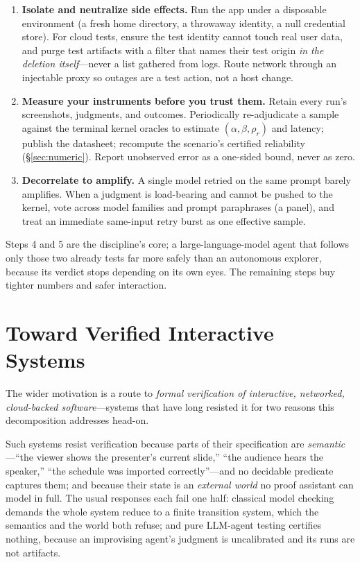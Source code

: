 \documentclass[acmsmall,screen,nonacm]{acmart}
\theoremstyle{acmdefinition}%
\theoremstyle{acmplain}%
\begin{document}
\begin{enumerate}
animation, streaming); the perception latency will read a state already
gone.
\item \textbf{Isolate and neutralize side effects.} Run the app under a
disposable environment (a fresh home directory, a throwaway identity, a
null credential store). For cloud tests, ensure the test identity cannot
touch real user data, and purge test artifacts with a filter that names
their test origin \emph{in the deletion itself}---never a list gathered
from logs. Route network through an injectable proxy so outages are a
test action, not a host change.
\item \textbf{Measure your instruments before you trust them.} Retain
every run's screenshots, judgments, and outcomes. Periodically
re-adjudicate a sample against the terminal kernel oracles to estimate
$(\alpha,\beta,\rho_r)$ and latency; publish the datasheet; recompute the
scenario's certified reliability (\S\ref{sec:numeric}). Report unobserved
error as a one-sided bound, never as zero.
\item \textbf{Decorrelate to amplify.} A single model retried on the same
prompt barely amplifies. When a judgment is load-bearing and cannot be
pushed to the kernel, vote across model families and prompt paraphrases
(a panel), and treat an immediate same-input retry burst as one effective
sample.
\end{enumerate}

Steps 4 and 5 are the discipline's core; a large-language-model agent that
follows only those two already tests far more safely than an autonomous
explorer, because its verdict stops depending on its own eyes. The
remaining steps buy tighter numbers and safer interaction.

\section{Toward Verified Interactive Systems}
\label{sec:verification}

The wider motivation is a route to \emph{formal verification of
interactive, networked, cloud-backed software}---systems that have long
resisted it for two reasons this decomposition addresses head-on.

Such systems resist verification because parts of their specification are
\emph{semantic}---``the viewer shows the presenter's current slide,''
``the audience hears the speaker,'' ``the schedule was imported
correctly''---and no decidable predicate captures them; and because their
state is an \emph{external world} no proof assistant can model in full. The
usual responses each fail one half: classical model checking demands the
whole system reduce to a finite transition system, which the semantics
and the world both refuse; and pure LLM-agent testing certifies nothing,
because an improvising agent's judgment is uncalibrated and its runs are
not artifacts.
\end{document}
